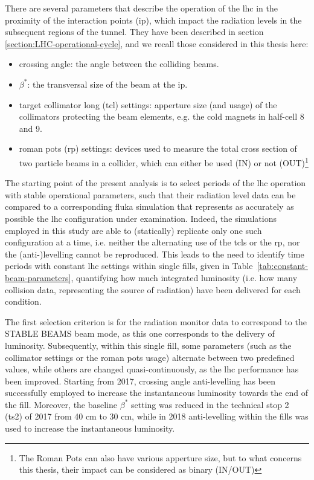 \documentclass[encoding=utf8,british]{tumphthesis}
\begin{document}
There are several parameters that describe the operation of the \acrshort{lhc} in the proximity of the interaction points (\acrshort{ip}), which impact the radiation levels in the subsequent regions of the tunnel. They have been described in section \ref{section:LHC-operational-cycle}, and we recall those considered in this thesis here:
\begin{itemize}
    \item crossing angle: the angle between the colliding beams.
    \item $\beta^*$: the transversal size of the beam at the \acrshort{ip}.
    \item target collimator long (\acrshort{tcl}) settings: apperture size (and usage) of the collimators protecting the beam elements, e.g. the cold magnets in half-cell 8 and 9. 
    \item roman pots (\acrshort{rp}) settings: devices used to measure the total cross section of two particle beams in a collider, which can either be used (IN) or not (OUT)\footnote{The Roman Pots can also have various apperture size, but to what concerns this thesis, their impact can be considered as binary (IN/OUT)}
\end{itemize}

The starting point of the present analysis is to select periods of the \acrshort{lhc} operation with stable operational parameters, such that their radiation level data can be compared to a corresponding \acrshort{fluka} simulation that represents as accurately as possible the \acrshort{lhc} configuration under examination. Indeed, the simulations employed in this study are able to (statically) replicate only one such configuration at a time, i.e. neither the alternating use of the \acrshort{tcl}s or the \acrshort{rp}, nor the (anti-)levelling cannot be reproduced. This leads to the need to identify time periods with constant \acrshort{lhc} settings within single fills, given in Table~\ref{tab:constant-beam-parameters}, quantifying how much integrated luminosity (i.e. how many collision data, representing the source of radiation) have been delivered for each condition.

The first selection criterion is for the radiation monitor data to correspond to the STABLE BEAMS beam mode, as this one corresponds to the delivery of luminosity. Subsequently, within this single fill, some parameters (such as the collimator settings or the roman pots usage) alternate between two predefined values, while others are changed quasi-continuously, as the \acrshort{lhc} performance has been improved. Starting from 2017, crossing angle anti-levelling has been successfully employed to increase the instantaneous luminosity towards the end of the fill. Moreover, the baseline $\beta^*$ setting was reduced in the technical stop 2 (\acrshort{ts}2) of 2017 from 40 cm to 30 cm, while in 2018 anti-levelling within the fills was used to increase the instantaneous luminosity.
\end{document}

